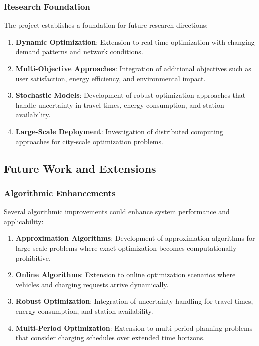 \documentclass[12pt,a4paper]{article}
\begin{document}
\subsubsection{Research Foundation}

The project establishes a foundation for future research directions:

\begin{enumerate}
\item \textbf{Dynamic Optimization}: Extension to real-time optimization with changing demand patterns and network conditions.
\item \textbf{Multi-Objective Approaches}: Integration of additional objectives such as user satisfaction, energy efficiency, and environmental impact.
\item \textbf{Stochastic Models}: Development of robust optimization approaches that handle uncertainty in travel times, energy consumption, and station availability.
\item \textbf{Large-Scale Deployment}: Investigation of distributed computing approaches for city-scale optimization problems.
\end{enumerate}

\subsection{Future Work and Extensions}

\subsubsection{Algorithmic Enhancements}

Several algorithmic improvements could enhance system performance and applicability:

\begin{enumerate}
\item \textbf{Approximation Algorithms}: Development of approximation algorithms for large-scale problems where exact optimization becomes computationally prohibitive.

\item \textbf{Online Algorithms}: Extension to online optimization scenarios where vehicles and charging requests arrive dynamically.

\item \textbf{Robust Optimization}: Integration of uncertainty handling for travel times, energy consumption, and station availability.

\item \textbf{Multi-Period Optimization}: Extension to multi-period planning problems that consider charging schedules over extended time horizons.
\end{enumerate}
\end{document}
